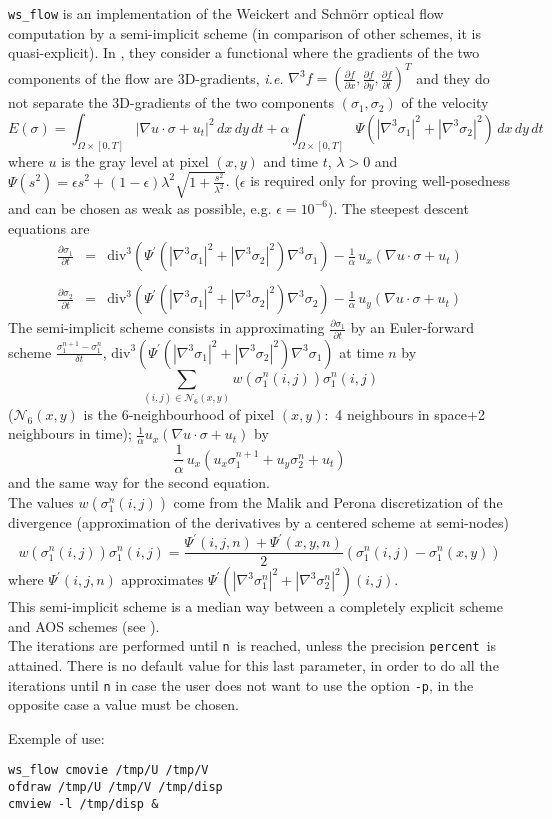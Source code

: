 \verb+ws_flow+ is an implementation of the Weickert and Schn\"orr optical flow computation by a semi-implicit scheme (in comparison of other schemes, it is quasi-explicit). 
In \cite{weickert.schnorr:of}, they consider a functional where the gradients of the two components of the flow are 3D-gradients, \emph{i.e.} $\nabla^{3} f=(\frac{\partial f}{\partial x},\frac{\partial f}{\partial y},\frac{\partial f}{\partial t})^{T}$ and they do not separate the 3D-gradients of the two components $(\sigma_{1},\sigma_{2})$ of the velocity
$$E(\sigma)=\int_{\Omega\times[0,T]}|\nabla u\cdot \sigma+u_{t}|^2\,dx\,dy\,dt+\alpha \int_{\Omega\times[0,T]} \Psi(|\nabla^{3}\sigma_{1}|^2+|\nabla^{3}\sigma_{2}|^2)\,dx\,dy\,dt$$
where $u$ is the gray level at pixel $(x,y)$ and time $t$, $\lambda>0$ and $\Psi(s^2)=\epsilon s^2+(1-\epsilon)\lambda^2\sqrt{1+\frac{s^2}{\lambda^2}}$. ($\epsilon$ is required only for proving well-posedness and can be chosen as weak as possible, e.g. $\epsilon=10^{-6}$). 
The steepest descent equations are
$$\begin{array}{rcl}
\frac{\partial \sigma_{1}}{\partial t} & = & \mathrm{div}^{3}(\Psi^{\prime}(|\nabla^{3}\sigma_{1}|^2+|\nabla^{3}\sigma_{2}|^2)\nabla^{3}\sigma_{1})-\frac{1}{\alpha}\,u_{x}(\nabla u\cdot \sigma+u_{t})\\
& &\\
\frac{\partial \sigma_{2}}{\partial t} & = & \mathrm{div}^{3}(\Psi^{\prime}(|\nabla^{3}\sigma_{1}|^2+|\nabla^{3}\sigma_{2}|^2)\nabla^{3}\sigma_{2})-\frac{1}{\alpha}\,u_{y}(\nabla u\cdot \sigma+u_{t})
\end{array}
$$ 
The semi-implicit scheme consists in approximating $\frac{\partial \sigma_{1}}{\partial t}$ by an Euler-forward scheme $\frac{\sigma_{1}^{n+1}-\sigma_{1}^{n}}{\delta t}$, $\mathrm{div}^{3}(\Psi^{\prime}(|\nabla^{3}\sigma_{1}|^2+|\nabla^{3}\sigma_{2}|^2)\nabla^{3}\sigma_{1})$ at time $n$ by
$$\sum_{(i,j)\in \mathcal{N}_{6}(x,y)} w(\sigma_{1}^{n}(i,j))\sigma_{1}^{n}(i,j)$$ 
($\mathcal{N}_{6}(x,y)$ is the 6-neighbourhood of pixel $(x,y)$:~4 neighbours in space+2 neighbours in time); $\frac{1}{\alpha}u_{x}(\nabla u\cdot \sigma+u_{t})$ by 
$$\frac{1}{\alpha}\,u_{x}(u_{x}\sigma_{1}^{n+1}+u_{y}\sigma_{2}^{n}+u_{t})$$ 
and the same way for the second equation.\\
The values $w(\sigma_{1}^{n}(i,j))$ come from the Malik and Perona discretization of the divergence (approximation of the derivatives by a centered scheme at semi-nodes)
$$w(\sigma_{1}^{n}(i,j))\sigma_{1}^{n}(i,j)=\frac{\Psi^{\prime}(i,j,n)+\Psi^{\prime}(x,y,n)}{2}(\sigma_{1}^{n}(i,j)-\sigma_{1}^{n}(x,y))$$
where $\Psi^{\prime}(i,j,n)$ approximates $\Psi^{\prime}(|\nabla^{3}\sigma_{1}^{n}|^2+|\nabla^{3}\sigma_{2}^{n}|^2)(i,j)$.\\
This semi-implicit scheme is a median way between a completely explicit scheme and AOS schemes (see \cite{weickert.romeny.ea:diffusion}). \\
The iterations are performed until \texttt{n}~is reached, unless the precision \texttt{percent}~is attained. There is no default value for this last parameter, in order to do all the iterations until \texttt{n} in case the user does not want to use the option \texttt{-p}, in the opposite case a value must be chosen.

\medskip

Exemple of use:
\begin{verbatim}
ws_flow cmovie /tmp/U /tmp/V
ofdraw /tmp/U /tmp/V /tmp/disp
cmview -l /tmp/disp &
\end{verbatim}
